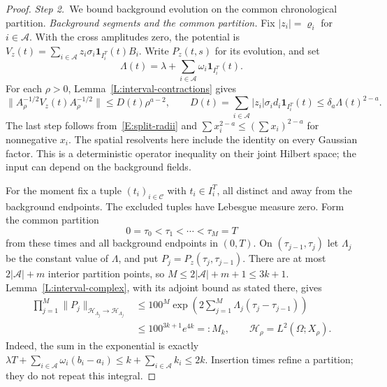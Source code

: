 \documentclass[12pt,oneside,openany]{book}
\numberwithin{equation}{section}
\theoremstyle{nogostyle}
\theoremstyle{definition}
\begin{document}
\begin{proof}
  \medskip
  \noindent\textit{Step 2.~}We bound background evolution on the common
  chronological partition.
  \emph{Background segments and the common partition.} Fix $|z_i| = \varrho_i$
  for $i \in \mathcal{A}$. With the cross amplitudes zero, the potential is
  $V_z(t) = \sum_{i\in\mathcal{A}}z_i\sigma_i\mathbf1_{I_i^T}(t)B_i$. Write
  $P_z(t,s)$ for its evolution, and set
  \[
    \Lambda(t)=\lambda+\sum_{i\in\mathcal{A}}
    \omega_i\mathbf1_{I_i^T}(t).
  \]
  For each $\rho > 0$, Lemma~\ref{L:interval-contractions} gives
  \[
    \|A_\rho^{-1/2}V_z(t)A_\rho^{-1/2}\|
    \le D(t)\rho^{a-2},\qquad
    D(t)=\sum_{i\in\mathcal{A}}|z_i|\sigma_i d_i
    \mathbf1_{I_i^T}(t)
    \le\delta_a\Lambda(t)^{2-a}.
  \]
  The last step follows from~\eqref{E:split-radii} and $\sum x_i^{2-a} \le (\sum
  x_i)^{2-a}$ for nonnegative $x_i$. The spatial resolvents here include the
  identity on every Gaussian factor. This is a deterministic operator inequality
  on their joint Hilbert space; the input can depend on the background fields.

  For the moment fix a tuple $(t_i)_{i\in\mathcal{C}}$ with $t_i \in I_i^T$, all
  distinct and away from the background endpoints. The excluded tuples have
  Lebesgue measure zero. Form the common partition
  \begin{equation}\label{E:split-partition}
    0=\tau_0<\tau_1<\cdots<\tau_M=T
  \end{equation}
  from these times and all background endpoints in $(0,T)$. On
  $(\tau_{j-1},\tau_j)$ let $\Lambda_j$ be the constant value of $\Lambda$, and
  put $P_j = P_z(\tau_j,\tau_{j-1})$. There are at most $2|\mathcal{A}|+m$
  interior partition points, so $M \le 2|\mathcal{A}|+m+1 \le 3k+1$.
  Lemma~\ref{L:interval-complex}, with its adjoint bound as stated there, gives
  \begin{equation}\label{E:split-segment-product}
    \begin{split}
      \prod_{j=1}^M\|P_j\|_{\mathcal{H}_{\Lambda_j}\to
      \mathcal{H}_{\Lambda_j}}
      &\le100^M\exp\left(2\sum_{j=1}^M
      \Lambda_j(\tau_j-\tau_{j-1})\right)\\
      &\le100^{3k+1}e^{4k}=:M_k,
      \qquad \mathcal{H}_\rho=L^2(\Omega;X_\rho).
    \end{split}
  \end{equation}
  Indeed, the sum in the exponential is exactly $\lambda
  T+\sum_{i\in\mathcal{A}}\omega_i(b_i-a_i) \le k+\sum_{i\in\mathcal{A}}k_i \le
  2k$. Insertion times refine a partition; they do not repeat this integral.



\end{proof}
\end{document}
